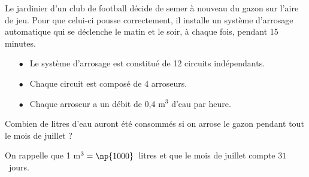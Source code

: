 
\medskip


Le jardinier d'un club de football décide de semer à nouveau du gazon sur l'aire de
jeu. Pour que celui-ci pousse correctement, il installe un système d'arrosage
automatique qui se déclenche le matin et le soir, à chaque fois, pendant 15 minutes.

\setlength\parindent{9mm}
\begin{itemize}
\item[$\bullet~~$] Le système d'arrosage est constitué de 12 circuits indépendants.
\item[$\bullet~~$] Chaque circuit est composé de 4 arroseurs.
\item[$\bullet~~$] Chaque arroseur a un débit de 0,4 m$^3$ d'eau par heure.
\end{itemize}
\setlength\parindent{0mm}

Combien de litres d'eau auront été consommés si on arrose le gazon pendant tout le
mois de juillet ?

On rappelle que 1 m$^3 = \np{1000}$~litres et que le mois de juillet compte $31$~jours.

\vspace{0,5cm}

